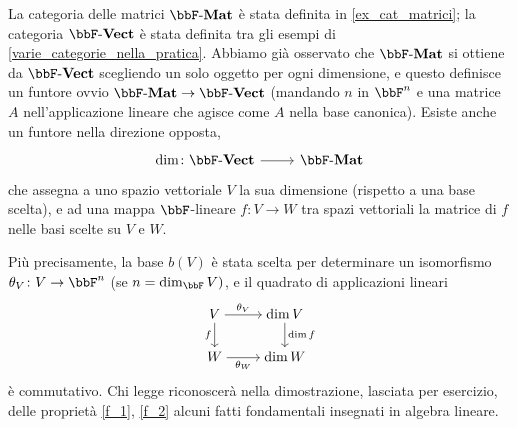 \begin{example}
 La categoria delle matrici \(\ctMat\) è stata definita in \ref{ex_cat_matrici}; la categoria \(\ctVect\) è stata definita tra gli esempi di \ref{varie_categorie_nella_pratica}. Abbiamo già osservato che \(\ctMat\) si ottiene da \(\ctVect\) scegliendo un solo oggetto per ogni dimensione, e questo definisce un funtore ovvio \(\ctMat \to \ctVect\) (mandando \(n\) in \(\bbF^n\) e una matrice \(A\) nell'applicazione lineare che agisce come \(A\) nella base canonica). Esiste anche un funtore nella direzione opposta,
 \[\dmFun{\dim}{\ctVect}{\ctMat}\]
 che assegna a uno spazio vettoriale \(V\) la sua dimensione (rispetto a una base scelta), e ad una mappa \(\bbF\)-lineare \(f \colon V\to W\) tra spazi vettoriali la matrice di \(f\) nelle basi scelte su \(V\) e \(W\).

 Più precisamente, la base \(b(V)\) è stata scelta per determinare un isomorfismo \(\theta_V \colon V \to \bbF^n\) (se \(n=\dim_\bbF V)\), e il quadrato di applicazioni lineari
 \[\begin{tikzcd}[cramped]
   V & {\dim V} \\
   W & {\dim W}
   \arrow["{\theta_V}", from=1-1, to=1-2]
   \arrow["f"', from=1-1, to=2-1]
   \arrow["\dim f", from=1-2, to=2-2]
   \arrow["{\theta_W}"', from=2-1, to=2-2]
  \end{tikzcd}\]
 è commutativo. Chi legge riconoscerà nella dimostrazione, lasciata per esercizio, delle proprietà \ref{f_1}, \ref{f_2} alcuni fatti fondamentali insegnati in algebra lineare.
\end{example}
